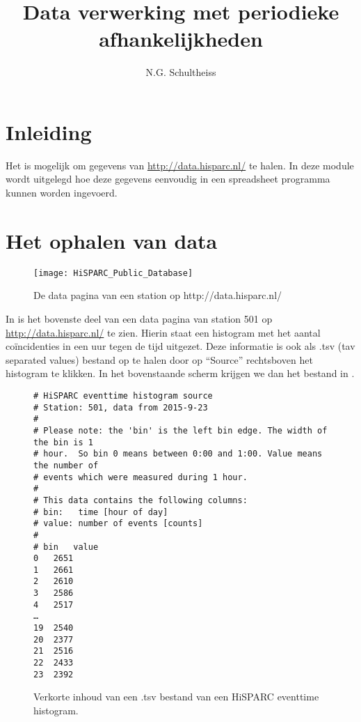 



\title{Data verwerking met periodieke afhankelijkheden}
\author{N.G. Schultheiss}
\date{}

\maketitle
\thispagestyle{firststyle}

\section{Inleiding}

Het is mogelijk om gegevens van \url{http://data.hisparc.nl/} te halen. In
deze module wordt uitgelegd hoe deze gegevens eenvoudig in een spreadsheet
programma kunnen worden ingevoerd.


\section{Het ophalen van data}

\begin{figure}[h]
    \centering
    \texttt{[image: HiSPARC\_Public\_Database]}
    \caption{\label{fig:datapagina}De data pagina van een station op http://data.hisparc.nl/}
\end{figure}


In  is het bovenste deel van een data pagina van station 501 op
\url{http://data.hisparc.nl/} te zien. Hierin staat een histogram met het
aantal coïncidenties in een uur tegen de tijd uitgezet. Deze informatie
is ook als .tsv (tav separated values) bestand op te halen door op
``Source'' rechtsboven het histogram te klikken. In het bovenstaande
scherm krijgen we dan het bestand in .

\begin{figure}[h]
\centering
\begin{verbatim}
# HiSPARC eventtime histogram source
# Station: 501, data from 2015-9-23
#
# Please note: the 'bin' is the left bin edge. The width of the bin is 1
# hour.  So bin 0 means between 0:00 and 1:00. Value means the number of
# events which were measured during 1 hour.
#
# This data contains the following columns:
# bin:   time [hour of day]
# value: number of events [counts]
#
# bin	value
0	2651
1	2661
2	2610
3	2586
4	2517
…
19	2540
20	2377
21	2516
22	2433
23	2392
\end{verbatim}
\caption{Verkorte inhoud van een .tsv bestand van een HiSPARC eventtime histogram.}
\label{fig:eventtime-source}
\end{figure}


